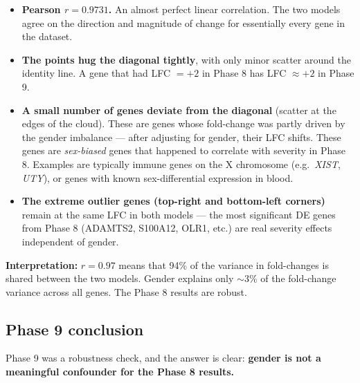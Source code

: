 \documentclass[11pt, a4paper]{article}
\begin{document}
\begin{itemize}[nosep]
  \item \textbf{Pearson $r = 0.9731$.} An almost perfect linear correlation.
        The two models agree on the direction and magnitude of change for
        essentially every gene in the dataset.

  \item \textbf{The points hug the diagonal tightly}, with only minor scatter
        around the identity line. A gene that had LFC $= +2$ in Phase 8 has
        LFC $\approx +2$ in Phase 9.

  \item \textbf{A small number of genes deviate from the diagonal} (scatter
        at the edges of the cloud). These are genes whose fold-change was
        partly driven by the gender imbalance — after adjusting for gender,
        their LFC shifts. These genes are \textit{sex-biased} genes that happened
        to correlate with severity in Phase 8. Examples are typically immune
        genes on the X chromosome (e.g.\  \textit{XIST}, \textit{UTY}), or
        genes with known sex-differential expression in blood.

  \item \textbf{The extreme outlier genes (top-right and bottom-left corners)}
        remain at the same LFC in both models — the most significant DE genes
        from Phase 8 (ADAMTS2, S100A12, OLR1, etc.) are real severity effects
        independent of gender.
\end{itemize}

\textbf{Interpretation:} $r = 0.97$ means that 94\% of the variance in
fold-changes is shared between the two models. Gender explains only $\sim$3\%
of the fold-change variance across all genes. The Phase 8 results are robust.

\subsection{Phase 9 conclusion}

Phase 9 was a robustness check, and the answer is clear:
\textbf{gender is not a meaningful confounder for the Phase 8 results.}
\end{document}
